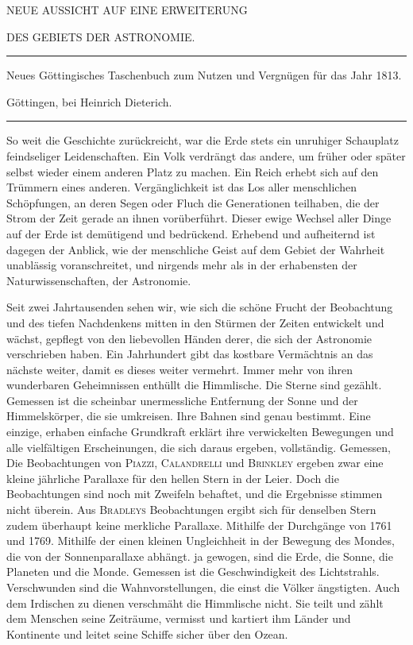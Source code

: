 \clearpage{}%
\begin{center}
{\small NEUE AUSSICHT AUF EINE ERWEITERUNG\par
DES GEBIETS DER ASTRONOMIE.\par}
\medskip\hrule\medskip
{\small Neues Göttingisches Taschenbuch zum Nutzen und Vergnügen für das Jahr 1813.\par
Göttingen, bei Heinrich Dieterich.\par}
\medskip\hrule
\end{center}\medskip
So weit die Geschichte zurückreicht, war die Erde stets ein unruhiger Schauplatz feindseliger Leidenschaften. Ein Volk verdrängt das andere, um früher oder später selbst wieder einem anderen Platz zu machen. Ein Reich erhebt sich auf den Trümmern eines anderen. Vergänglichkeit ist das Los aller menschlichen Schöpfungen, an deren Segen oder Fluch die Generationen teilhaben, die der Strom der Zeit gerade an ihnen vorüberführt. Dieser ewige Wechsel aller Dinge auf der Erde ist demütigend und bedrückend. Erhebend und aufheiternd ist dagegen der Anblick, wie der menschliche Geist auf dem Gebiet der Wahrheit unablässig voranschreitet, und nirgends mehr als in der erhabensten der Naturwissenschaften, der Astronomie.

Seit zwei Jahrtausenden sehen wir, wie sich die schöne Frucht der Beobachtung und des tiefen Nachdenkens mitten in den Stürmen der Zeiten entwickelt und wächst, gepflegt von den liebevollen Händen derer, die sich der Astronomie verschrieben haben. Ein Jahrhundert gibt das kostbare Vermächtnis an das nächste weiter, damit es dieses weiter vermehrt. Immer mehr von ihren wunderbaren Geheimnissen enthüllt die Himmlische. Die Sterne sind gezählt. Gemessen ist die scheinbar unermessliche Entfernung der Sonne und der Himmelskörper, die sie umkreisen. Ihre Bahnen sind genau bestimmt. Eine einzige, erhaben einfache Grundkraft erklärt ihre verwickelten Bewegungen und alle vielfältigen Erscheinungen, die sich daraus ergeben, vollständig. Gemessen,
\expandafter\def\csname HistoricalNoteText13\endcsname{Die Beobachtungen von \textsc{Piazzi}, \textsc{Calandrelli} und \textsc{Brinkley} ergeben zwar eine kleine jährliche Parallaxe für den hellen Stern in der Leier. Doch die Beobachtungen sind noch mit Zweifeln behaftet, und die Ergebnisse stimmen nicht überein. Aus \textsc{Bradleys} Beobachtungen ergibt sich für denselben Stern zudem überhaupt keine merkliche Parallaxe.}%
\expandafter\def\csname HistoricalNoteText14\endcsname{Mithilfe der Durchgänge von 1761 und 1769.}%
\expandafter\def\csname HistoricalNoteText15\endcsname{Mithilfe der einen kleinen Ungleichheit in der Bewegung des Mondes, die von der Sonnenparallaxe abhängt.}%
%
ja gewogen, sind die Erde, die Sonne, die Planeten und die Monde. Gemessen ist die Geschwindigkeit des Lichtstrahls. Verschwunden sind die Wahnvorstellungen, die einst die Völker ängstigten. Auch dem Irdischen zu dienen verschmäht die Himmlische nicht. Sie teilt und zählt dem Menschen seine Zeiträume, vermisst und kartiert ihm Länder und Kontinente und leitet seine Schiffe sicher über den Ozean.

